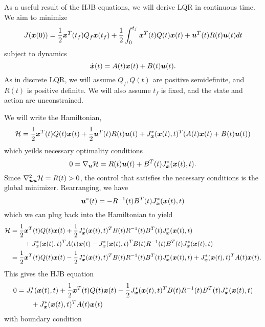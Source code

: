 As a useful result of the HJB equations, we will derive LQR in continuous time. We aim to minimize 
\begin{equation}
    J(\bm{x}(0)) = \frac{1}{2} \bm{x}^T(t_f) Q_f \bm{x}(t_f) + \frac{1}{2} \int_0^{t_f} \bm{x}^T(t) Q(t) \bm{x}(t) + \bm{u}^T(t) R(t) \bm{u}(t) dt
\end{equation}
subject to dynamics
\begin{equation}
    \dot{\bm{x}}(t) = A(t) \bm{x}(t) + B(t) \bm{u}(t).
\end{equation}
As in discrete LQR, we will assume $Q_f, Q(t)$ are positive semidefinite, and $R(t)$ is positive definite. We will also assume $t_f$ is fixed, and the state and action are unconstrained. 

We will write the Hamiltonian, 
\begin{equation}
    \mathcal{H} = \frac{1}{2} \bm{x}^T(t) Q(t) \bm{x}(t) + \frac{1}{2} \bm{u}^T(t) R(t) \bm{u}(t) + J^*_{\bm{x}}(\bm{x}(t),t)^T (A(t) \bm{x}(t) + B(t) \bm{u}(t))
\end{equation}
which yeilds necessary optimality conditions 
\begin{equation}
    0 = \nabla_{\bm{u}} \mathcal{H} = R(t) \bm{u}(t) + B^T(t) J^*_{\bm{x}}(\bm{x}(t),t).
\end{equation}
Since $\nabla_{\bm{u} \bm{u}}^2 \mathcal{H} = R(t) > 0$, the control that satisfies the necessary conditions is the global minimizer. Rearranging, we have
\begin{equation}
    \bm{u}^*(t) = - R^{-1}(t) B^T(t) J^*_{\bm{x}}(\bm{x}(t),t)
\end{equation}
which we can plug back into the Hamiltonian to yield
\begin{align}
    \mathcal{H} &= \frac{1}{2} \bm{x}^T(t) Q(t) \bm{x}(t) + \frac{1}{2} J^*_{\bm{x}}(\bm{x}(t),t)^T B(t) R^{-1}(t) B^T(t) J^*_{\bm{x}}(\bm{x}(t),t)\\
     &\qquad + J^*_{\bm{x}}(\bm{x}(t),t)^T A(t) \bm{x}(t) - J^*_{\bm{x}}(\bm{x}(t),t)^T B(t) R^{-1}(t) B^T(t) J^*_{\bm{x}}(\bm{x}(t),t)\nonumber\\
     &= \frac{1}{2} \bm{x}^T(t) Q(t) \bm{x}(t) - \frac{1}{2} J^*_{\bm{x}}(\bm{x}(t),t)^T B(t) R^{-1}(t) B^T(t) J^*_{\bm{x}}(\bm{x}(t),t) + J^*_{\bm{x}}(\bm{x}(t),t)^T A(t) \bm{x}(t).
\end{align}
This gives the HJB equation
\begin{align}
    0 &= J_t^*(\bm{x}(t),t) + \frac{1}{2} \bm{x}^T(t) Q(t) \bm{x}(t) - \frac{1}{2} J^*_{\bm{x}}(\bm{x}(t),t)^T B(t) R^{-1}(t) B^T(t) J^*_{\bm{x}}(\bm{x}(t),t)\\
    &\qquad + J^*_{\bm{x}}(\bm{x}(t),t)^T A(t) \bm{x}(t)\nonumber
\end{align}
with boundary condition 
